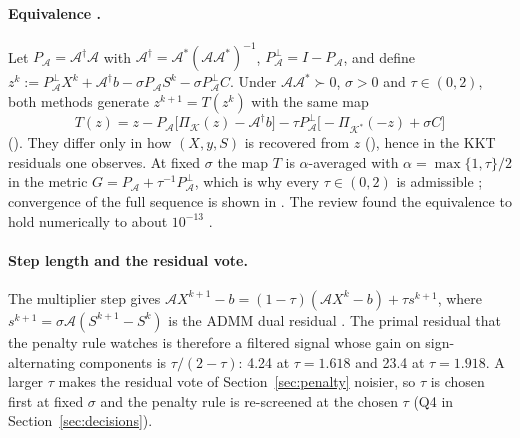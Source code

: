 \documentclass[11pt]{article}
\newcommand{\K}{\mathcal{K}}
\newcommand{\Kd}{\mathcal{K}^{*}}
\newcommand{\A}{\mathcal{A}}
\newcommand{\Ad}{\mathcal{A}^{*}}
\newcommand{\Proj}{\Pi}
\begin{document}
\paragraph{Equivalence \cite{afterimage}.} Let $P_\A = \A^{\dagger}\A$ with
$\A^{\dagger} = \Ad(\A\Ad)^{-1}$, $P_\A^{\perp} = I - P_\A$, and define
$z^k := P_\A^{\perp}X^k + \A^{\dagger}b - \sigma P_\A S^k - \sigma P_\A^{\perp}C$. Under $\A\Ad\succ0$,
$\sigma>0$ and $\tau\in(0,2)$, both methods generate $z^{k+1} = T(z^k)$ with the same map
\begin{equation}\label{eq:zmap}
T(z) = z - P_\A\big[\Proj_{\K}(z) - \A^{\dagger}b\big] - \tau P_\A^{\perp}\big[-\Proj_{\Kd}(-z) + \sigma C\big]
\end{equation}
(\cite[Table~1, eqs.~(13) and (21)]{afterimage}). They differ only in how $(X,y,S)$ is recovered from $z$
(\cite[eqs.~(14) and (22)]{afterimage}), hence in the KKT residuals one observes. At fixed $\sigma$ the map
$T$ is $\alpha$-averaged with $\alpha = \max\{1,\tau\}/2$ in the metric $G = P_\A + \tau^{-1}P_\A^{\perp}$,
which is why every $\tau\in(0,2)$ is admissible \cite{afterimage}; convergence of the full sequence is
shown in \cite{chen2021}. The review found the equivalence to hold numerically to about $10^{-13}$
\cite{review20}.

\paragraph{Step length and the residual vote.} The multiplier step gives
$\A X^{k+1} - b = (1-\tau)(\A X^k - b) + \tau s^{k+1}$, where $s^{k+1} = \sigma\A(S^{k+1}-S^k)$ is the ADMM
dual residual \cite{sigmastudy}. The primal residual that the penalty rule watches is therefore a
filtered signal whose gain on sign-alternating components is $\tau/(2-\tau)$: 4.24 at $\tau = 1.618$ and
23.4 at $\tau = 1.918$. A larger $\tau$ makes the residual vote of Section~\ref{sec:penalty} noisier, so
$\tau$ is chosen first at fixed $\sigma$ and the penalty rule is re-screened at the chosen $\tau$ (Q4 in
Section~\ref{sec:decisions}).
\end{document}

